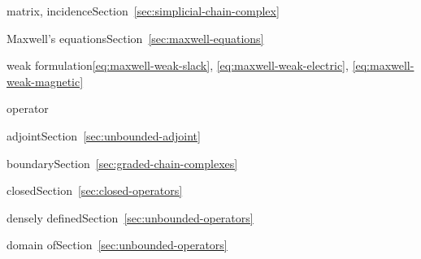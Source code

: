 \par\noindent\hspace*{0em}\label{index:matrix-incidence}{matrix, incidence}\quad Section~\ref{sec:simplicial-chain-complex}

\par\noindent\hspace*{0em}\label{index:maxwell-s-equations}{Maxwell's equations}\quad Section~\ref{sec:maxwell-equations}

\par\noindent\hspace*{1em}\label{index:maxwell-s-equations-weak-formulation}{weak formulation}\quad \eqref{eq:maxwell-weak-slack}, \eqref{eq:maxwell-weak-electric}, \eqref{eq:maxwell-weak-magnetic}

\par\noindent\hspace*{0em}\label{index:operator}{operator}

\par\noindent\hspace*{1em}\label{index:operator-adjoint}{adjoint}\quad Section~\ref{sec:unbounded-adjoint}

\par\noindent\hspace*{1em}\label{index:operator-boundary}{boundary}\quad Section~\ref{sec:graded-chain-complexes}

\par\noindent\hspace*{1em}\label{index:operator-closed}{closed}\quad Section~\ref{sec:closed-operators}

\par\noindent\hspace*{1em}\label{index:operator-densely-defined}{densely defined}\quad Section~\ref{sec:unbounded-operators}

\par\noindent\hspace*{1em}\label{index:operator-domain-of}{domain of}\quad Section~\ref{sec:unbounded-operators}

